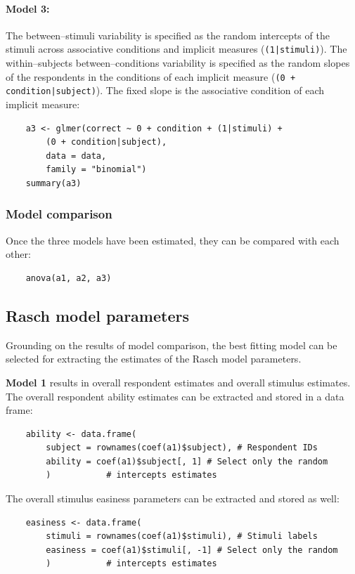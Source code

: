 \documentclass[12pt]{book}
\begin{document}
\paragraph*{Model 3:}  
The between--stimuli variability is specified as the random intercepts of the stimuli across associative conditions and implicit measures (\texttt{(1|stimuli)}). 
The within--subjects between--conditions variability is specified as the random slopes of the respondents in the conditions of each implicit measure (\texttt{(0 + condition|subject)}).
The fixed slope is the associative condition of each implicit measure:
%
\begin{lstlisting}
	a3 <- glmer(correct ~ 0 + condition + (1|stimuli) + 
		(0 + condition|subject),
		data = data, 
		family = "binomial")
	summary(a3) 
\end{lstlisting}



\subsubsection{Model comparison}

Once the three models have been estimated, they can be compared with each other: 
%
\begin{lstlisting}
	anova(a1, a2, a3)
\end{lstlisting}


\subsection{Rasch model parameters}
Grounding on the results of model comparison, the best fitting model can be selected for extracting the estimates of the Rasch model parameters. 

\textbf{Model 1} results in overall respondent estimates and overall stimulus estimates. 
The overall respondent ability estimates can be extracted and stored in a data frame: 
%
\begin{lstlisting}
	ability <- data.frame(
		subject = rownames(coef(a1)$subject), # Respondent IDs
		ability = coef(a1)$subject[, 1] # Select only the random
		)			# intercepts estimates
\end{lstlisting}
The overall stimulus easiness parameters can be extracted and stored as well: 
%
\begin{lstlisting}
	easiness <- data.frame(
		stimuli = rownames(coef(a1)$stimuli), # Stimuli labels
		easiness = coef(a1)$stimuli[, -1] # Select only the random 
		) 			# intercepts estimates	
\end{lstlisting}
\end{document}
